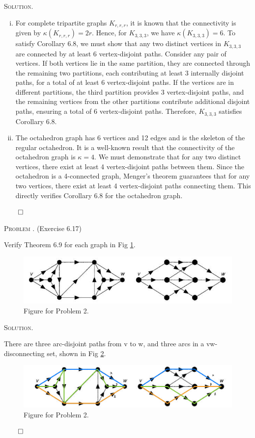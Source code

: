 \documentclass[12pt, a4paper, oneside]{ctexart}
\newcounter{problemname}
\newenvironment{problem}{\begin{framed}\stepcounter{problemname}\par\noindent\textsc{Problem \arabic{problemname}. }}{\end{framed}\par}
\newenvironment{solution}{%
	\par\noindent\textsc{Solution. }\ignorespaces
}{%
	\hfill$\qed$\par
}
\begin{document}
\begin{solution}
\begin{enumerate}[(i)]
			\item For complete tripartite graphs \(K_{r,r,r}\), it is known that the connectivity is given by \(\kappa(K_{r,r,r}) = 2r\). Hence, for \(K_{3,3,3}\), we have \(\kappa(K_{3,3,3}) = 6\). To satisfy Corollary 6.8, we must show that any two distinct vertices in \(K_{3,3,3}\) are connected by at least 6 vertex-disjoint paths. Consider any pair of vertices. If both vertices lie in the same partition, they are connected through the remaining two partitions, each contributing at least 3 internally disjoint paths, for a total of at least 6 vertex-disjoint paths. If the vertices are in different partitions, the third partition provides 3 vertex-disjoint paths, and the remaining vertices from the other partitions contribute additional disjoint paths, ensuring a total of 6 vertex-disjoint paths. Therefore, \(K_{3,3,3}\) satisfies Corollary 6.8.
			\item The octahedron graph has 6 vertices and 12 edges and is the skeleton of the regular octahedron. It is a well-known result that the connectivity of the octahedron graph is \(\kappa = 4\). We must demonstrate that for any two distinct vertices, there exist at least 4 vertex-disjoint paths between them. Since the octahedron is a 4-connected graph, Menger's theorem guarantees that for any two vertices, there exist at least 4 vertex-disjoint paths connecting them. This directly verifies Corollary 6.8 for the octahedron graph.
		\end{enumerate}
		
	\end{solution}
	
	\begin{problem}
		(Exercise 6.17)
		
		Verify Theorem 6.9 for each graph in Fig \ref{fig:1}.
					\begin{figure}[H]
							\small
							\centering
							\includegraphics[width=0.8\columnwidth]{Figure/Fig1.png}
							\caption{Figure for Problem 2.}
							\label{fig:1}
						\end{figure}
	\end{problem}
	
	\begin{solution}
		There are three arc-disjoint paths from v to w, and three arcs in a vw-disconnecting set, shown in Fig \ref{fig:2}.
		\begin{figure}[H]
			\small
			\centering
			\includegraphics[width=0.8\columnwidth]{Figure/Fig2.jpg}
			\caption{Figure for Problem 2.}
			\label{fig:2}
		\end{figure}
	\end{solution}
	
\end{document}
